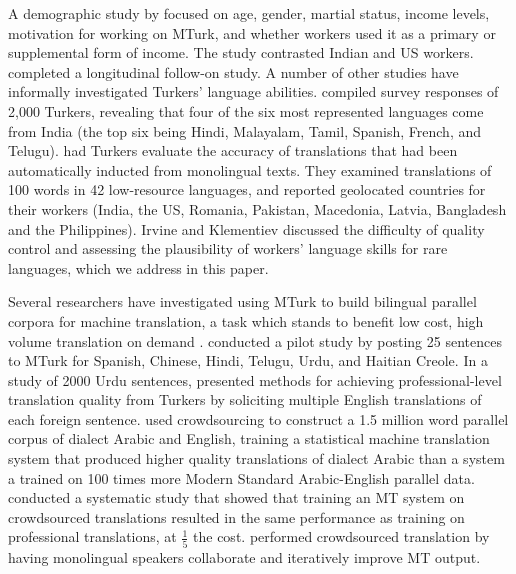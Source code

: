\documentclass[11pt]{article}
\begin{document}
A demographic study by  focused on age, gender, martial status, income levels, motivation for working on MTurk, and whether workers used it as a primary or supplemental form of income.  The study contrasted Indian and US workers.  completed a longitudinal follow-on study. 
A number of other studies have informally investigated Turkers' language abilities.   compiled survey responses of 2,000 Turkers, revealing that four of the six most represented languages come from India (the top six being Hindi, Malayalam, Tamil, Spanish, French, and Telugu).   had Turkers evaluate the accuracy of translations that had been automatically inducted from monolingual texts.  They examined translations of 100 words in 42 low-resource languages, and reported geolocated countries for their workers (India, the US, Romania, Pakistan, Macedonia, Latvia, Bangladesh and the Philippines).  Irvine and Klementiev discussed the difficulty of quality control and assessing the plausibility of workers' language skills for rare languages, which we address in this paper. 

Several researchers have investigated using MTurk to build bilingual parallel corpora for machine translation, a task which stands to benefit low cost, high volume  translation on demand \cite{Germann2001}.   conducted a pilot study by posting 25 sentences to MTurk for Spanish, Chinese, Hindi, Telugu, Urdu, and Haitian Creole.  In a study of 2000 Urdu sentences, 
 presented methods for achieving professional-level translation quality from Turkers by soliciting multiple English translations of each foreign sentence. 
 used crowdsourcing to construct a 1.5 million word parallel corpus of dialect Arabic and English, training a statistical machine translation system that produced higher quality translations of dialect Arabic than a system a trained on 100 times more Modern Standard Arabic-English parallel data.  conducted a systematic study that showed that training an MT system on crowdsourced translations resulted in the same performance as training on professional translations, at $\frac{1}{5}$ the cost.
 performed crowdsourced translation by having monolingual speakers collaborate and iteratively improve MT output.

\end{document}
